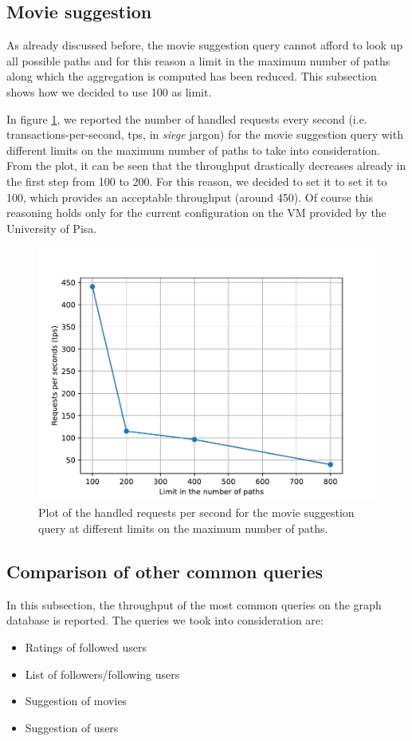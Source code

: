 \documentclass[11pt]{article}
\begin{document}
\subsection{Movie suggestion}
As already discussed before, the movie suggestion query cannot afford to look
up all possible paths and for this reason a limit in the maximum number of paths
along which the aggregation is computed has been reduced. This subsection 
shows how we decided to use 100 as limit.

In figure \ref{fig:tps_mp}, we reported the number of handled requests every 
second (i.e. transactions-per-second, tps, in \emph{siege} jargon) for the 
movie suggestion query with different limits on the maximum number of paths to 
take into consideration. From the plot, it can be seen that the throughput 
drastically decreases already in the first step from 100 to 200. For this 
reason, we decided to set it to set it to 100, which provides an acceptable 
throughput (around 450). Of course this reasoning holds only for the current 
configuration on the VM provided by the University of Pisa.

\begin{figure}[]
    \centering
    \includegraphics[width=\textwidth]{figs/tps_max_path.pdf}
    \caption{Plot of the handled requests per second for the movie suggestion query at different limits on the maximum number of paths.}
    \label{fig:tps_mp}
\end{figure}

\subsection{Comparison of other common queries}
In this subsection, the throughput of the most common queries on the graph 
database is reported. The queries we took into consideration are:
\begin{itemize}
    \item Ratings of followed users
    \item List of followers/following users
    \item Suggestion of movies
    \item Suggestion of users
\end{itemize}
\end{document}
